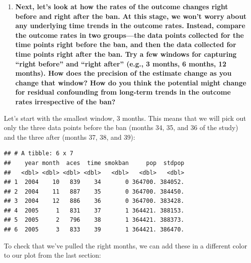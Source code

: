 \documentclass[
]{book}
\newenvironment{Shaded}{\begin{snugshade}}{\end{snugshade}}
\newcommand{\DecValTok}[1]{\textcolor[rgb]{0.00,0.00,0.81}{#1}}
\newcommand{\KeywordTok}[1]{\textcolor[rgb]{0.13,0.29,0.53}{\textbf{#1}}}
\newcommand{\NormalTok}[1]{#1}
\newcommand{\OperatorTok}[1]{\textcolor[rgb]{0.81,0.36,0.00}{\textbf{#1}}}
\newcommand{\StringTok}[1]{\textcolor[rgb]{0.31,0.60,0.02}{#1}}
\providecommand{\tightlist}{%
  \setlength{\itemsep}{0pt}\setlength{\parskip}{0pt}}
\begin{document}
\begin{enumerate}
\def\labelenumi{\arabic{enumi}.}
\setcounter{enumi}{1}
\tightlist
\item
  \textbf{Next, let's look at how the rates of the outcome changes right before and right after the ban. At this stage, we won't worry about any underlying time trends in the outcome rates. Instead, compare the outcome rates in two groups---the data points collected for the time points right before the ban, and then the data collected for time points right after the ban. Try a few windows for capturing ``right before'' and ``right after'' (e.g., 3 months, 6 months, 12 months). How does the precision of the estimate change as you change that window? How do you think the potential might change for residual confounding from long-term trends in the outcome rates irrespective of the ban?}
\end{enumerate}

Let's start with the smallest window, 3 months. This means that we will pick out
only the three data points before the ban (months 34, 35, and 36 of the study) and the three after (months 37, 38, and 39):

\begin{Shaded}
\end{Shaded}

\begin{verbatim}
## # A tibble: 6 x 7
##    year month  aces  time smokban     pop  stdpop
##   <dbl> <dbl> <dbl> <dbl>   <dbl>   <dbl>   <dbl>
## 1  2004    10   839    34       0 364700. 384052.
## 2  2004    11   887    35       0 364700. 384450.
## 3  2004    12   886    36       0 364700. 383428.
## 4  2005     1   831    37       1 364421. 388153.
## 5  2005     2   796    38       1 364421. 388373.
## 6  2005     3   833    39       1 364421. 386470.
\end{verbatim}

To check that we've pulled the right months, we can add these in a different color to our plot from the last section:
\end{document}
